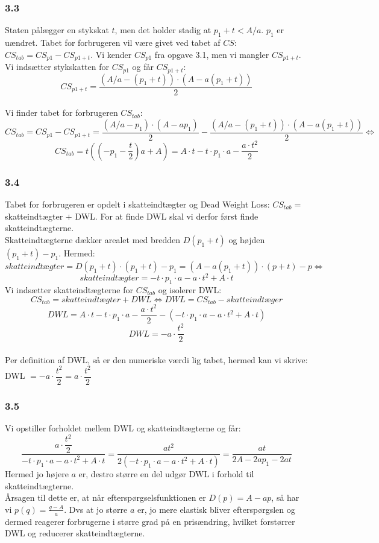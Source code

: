\documentclass[a4paper, 12pt]{article}
\begin{document}
\subsubsection*{3.3}
Staten pålægger en stykskat $t$, men det holder stadig at $p_{1} + t < A/a$. $p_{1}$ er uændret. Tabet for forbrugeren vil være givet ved tabet af $CS$: $CS_{tab} = CS_{p1} - CS_{p1 + t}$. Vi kender $CS_{p1}$ fra opgave 3.1, men vi mangler $CS_{p1 + t}$. Vi indsætter stykskatten for $CS_{p1}$ og får $CS_{p1 + t}$:
$$CS_{p1 + t} =  \dfrac{(A / a - (p_{1} + t)) \cdot (A - a(p_{1} + t))}{2} $$
\\
Vi finder tabet for forbrugeren $CS_{tab}$:
$$CS_{tab} = CS_{p1} - CS_{p1 + t} = \dfrac{(A / a - p_{1}) \cdot (A - ap_{1})}{2} -  \dfrac{(A / a - (p_{1} + t)) \cdot (A - a(p_{1} + t))}{2} \Leftrightarrow$$
$$CS_{tab} = t \left( \left(-p_{1} - \dfrac{t}{2} \right)a + A \right) = A \cdot t - t \cdot p_{1} \cdot a - \dfrac{a\cdot t^{2}}{2}$$

\subsubsection*{3.4}
Tabet for forbrugeren er opdelt i skatteindtægter og Dead Weight Loss: $CS_{tab} =$ skatteindtægter $+$ DWL. For at finde DWL skal vi derfor først finde skatteindtægterne.
\\
Skatteindtægterne dækker arealet med bredden $D(p_{1}+t)$ og højden $(p_{1}+t)-p_{1}$. Hermed:
$$skatteindtægter = D(p_{1}+t) \cdot (p_{1}+t)-p_{1} = (A-a(p_{1}+t))\cdot (p+t)-p \Leftrightarrow$$
$$skatteindtægter = -t\cdot p_{1} \cdot a - a \cdot t^{2} + A \cdot t$$
Vi indsætter skatteindtægterne for $CS_{tab}$ og isolerer DWL:
$$CS_{tab} = skatteindtægter + DWL \Leftrightarrow DWL = CS_{tab} - skatteindtæger$$
$$DWL = A \cdot t - t \cdot p_{1} \cdot a - \dfrac{a\cdot t^{2}}{2} - \left( -t\cdot p_{1} \cdot a - a \cdot t^{2} + A \cdot t  \right)$$
$$DWL = - a \cdot \dfrac{t^{2}}{2}$$
\\
Per definition af DWL, så er den numeriske værdi lig tabet, hermed kan vi skrive:
\\
DWL $= - a \cdot \dfrac{t^{2}}{2} =a \cdot \dfrac{t^{2}}{2}$
\subsubsection*{3.5}
Vi opstiller forholdet mellem DWL og skatteindtægterne og får:
$$\dfrac{a \cdot \dfrac{t^{2}}{2}}{-t\cdot p_{1} \cdot a - a \cdot t^{2} + A \cdot t } = \dfrac{at^{2}}{2 \left( -t\cdot p_{1} \cdot a - a \cdot t^{2} + A \cdot t   \right)} = \dfrac{at}{2A - 2ap_{1} -2at}$$
Hermed jo højere $a$ er, destro større en del udgør DWL i forhold til skatteindtægterne.
\\
Årsagen til dette er, at når efterspørgselsfunktionen er $D(p) = A-ap$, så har vi $p(q) = \frac{q - A}{a}$. Dvs at jo større $a$ er, jo mere elastisk bliver efterspørgslen og dermed reagerer forbrugerne i større grad på en prisændring, hvilket forstørrer DWL og reducerer skatteindtægterne.


\end{document}
